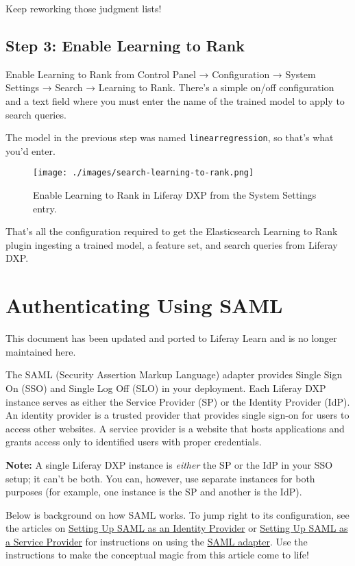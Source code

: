 Keep reworking those judgment lists!

\section{Step 3: Enable Learning to
Rank}\label{step-3-enable-learning-to-rank}

Enable Learning to Rank from Control Panel → Configuration → System
Settings → Search → Learning to Rank. There's a simple on/off
configuration and a text field where you must enter the name of the
trained model to apply to search queries.

The model in the previous step was named \texttt{linearregression}, so
that's what you'd enter.

\begin{figure}
\centering
\texttt{[image: ./images/search-learning-to-rank.png]}
\caption{Enable Learning to Rank in Liferay DXP from the System Settings
entry.}
\end{figure}

That's all the configuration required to get the Elasticsearch Learning
to Rank plugin ingesting a trained model, a feature set, and search
queries from Liferay DXP.

\chapter{Authenticating Using SAML}\label{authenticating-using-saml}

{This document has been updated and ported to Liferay Learn and is no
longer maintained here.}

The SAML (Security Assertion Markup Language) adapter provides Single
Sign On (SSO) and Single Log Off (SLO) in your deployment. Each Liferay
DXP instance serves as either the Service Provider (SP) or the Identity
Provider (IdP). An identity provider is a trusted provider that provides
single sign-on for users to access other websites. A service provider is
a website that hosts applications and grants access only to identified
users with proper credentials.

\noindent\hrulefill

\textbf{Note:} A single Liferay DXP instance is \emph{either} the SP or
the IdP in your SSO setup; it can't be both. You can, however, use
separate instances for both purposes (for example, one instance is the
SP and another is the IdP).

\noindent\hrulefill

Below is background on how SAML works. To jump right to its
configuration, see the articles on
\href{/docs/7-2/deploy/-/knowledge_base/d/setting-up-liferay-as-a-saml-identity-provider}{Setting
Up SAML as an Identity Provider} or
\href{/docs/7-2/deploy/-/knowledge_base/d/setting-up-liferay-as-a-saml-service-provider}{Setting
Up SAML as a Service Provider} for instructions on using the
\href{https://web.liferay.com/marketplace/-/mp/application/15188711}{SAML
adapter}. Use the instructions to make the conceptual magic from this
article come to life!

